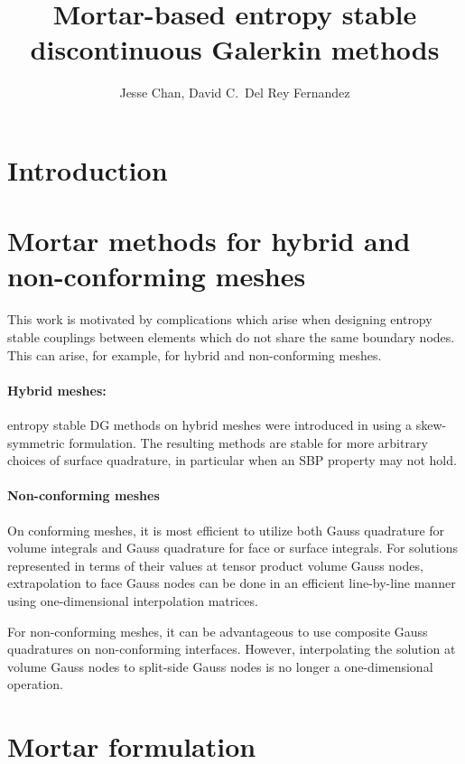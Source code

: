 \documentclass[review]{siamart0216}
\author{Jesse Chan, David C.\ Del Rey Fernandez}
\title{Mortar-based entropy stable discontinuous Galerkin methods}
\newcommand{\note}[1]{{\color{blue}{#1}}}
\begin{document}
\maketitle

\section{Introduction}

\note{Boilerplate introduction on high order + stability}



\section{Mortar methods for hybrid and non-conforming meshes}

This work is motivated by complications which arise when designing entropy stable couplings between elements which do not share the same boundary nodes.  This can arise, for example, for hybrid and non-conforming meshes.  

\paragraph{Hybrid meshes:} entropy stable DG methods on hybrid meshes were introduced in \cite{chan2018skew} using a skew-symmetric formulation.  The resulting methods are stable for more arbitrary choices of surface quadrature, in particular when an SBP property may not hold.  

\paragraph{Non-conforming meshes}

On conforming meshes, it is most efficient to utilize both Gauss quadrature for volume integrals and Gauss quadrature for face or surface integrals.  For solutions represented in terms of their values at tensor product volume Gauss nodes, extrapolation to face Gauss nodes can be done in an efficient line-by-line manner using one-dimensional interpolation matrices.  

For non-conforming meshes, it can be advantageous to use composite Gauss quadratures on non-conforming interfaces.  \note{Reference JK and LCW's paper on full-side vs split side mortars.}  However, interpolating the solution at volume Gauss nodes to split-side Gauss nodes is no longer a one-dimensional operation.

\section{Mortar formulation}
\end{document}
